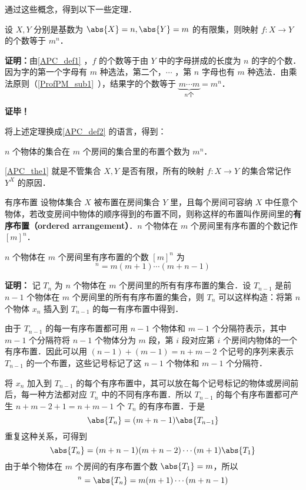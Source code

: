 通过这些概念，得到以下一些定理．

\begin{theorem}{}\label{APC_the1}
设 $X,Y$ 分别是基数为 $\abs{X}=n,\abs{Y}=m$ 的有限集，则映射 $f:X\rightarrow Y$ 的个数等于 $m^n$．
\end{theorem}
\textbf{证明：}由\autoref{APC_def1} ，$f$ 的个数等于由 $Y$ 中的字母拼成的长度为 $n$ 的字的个数．因为字的第一个字母有 $m$ 种选法，第二个，$\cdots$ ，第 $n$ 字母也有 $m$ 种选法．由乘法原则（\autoref{ProfPM_sub1}~），结果字的个数等于 $\underbrace{m\cdots m}_{n\text{个}}=m^n$．

\textbf{证毕！}

将上述定理换成\autoref{APC_def2} 的语言，得到：
\begin{theorem}{}
$n$ 个物体的集合在 $m$ 个房间的集合里的布置个数为 $m^n$．
\end{theorem}

\autoref{APC_the1} 就是不管集合 $X,Y$ 是否有限，所有的映射 $f:X\rightarrow Y$ 的集合常记作 $Y^X$ 的原因．

\begin{definition}{有序布置}
设物体集合 $X$ 被布置在房间集合 $Y$ 里，且每个房间可容纳 $X$ 中任意个物体，若改变房间中物体的顺序得到的布置不同，则称这样的布置叫作房间里的\textbf{有序布置（ordered arrangement）}．$n$ 个物体在 $m$ 个房间里有序布置的个数记作 $[m]^n$．
\end{definition}
\begin{theorem}{}
$n$ 个物体在 $m$ 个房间里有序布置的个数 $[m]^n$ 为
\begin{equation}
[m]^n=m(m+1)\cdots(m+n-1)
\end{equation}
\end{theorem}
\textbf{证明：}
记 $T_n$ 为 $n$ 个物体在 $m$ 个房间里的所有有序布置的集合．设 $T_{n-1}$ 是前 $n-1$ 个物体在 $m$ 个房间里的所有有序布置的集合，则 $T_n$ 可以这样构造：将第 $n$ 个物体 $x_n$ 插入到 $T_{n-1}$ 的每一有序布置中得到．

由于 $T_{n-1}$ 的每一有序布置都可用 $n-1$ 个物体和 $m-1$ 个分隔符表示，其中 $m-1$ 个分隔符将 $n-1$ 个物体分为 $m$ 段，第 $i$ 段对应第 $i$ 个房间内物体的一个有序布置．因此可以用 $(n-1)+(m-1)=n+m-2$ 个记号的序列来表示 $T_{n-1}$ 的一个布置，这些记号标记了这 $n-1$ 个物体和 $m-1$ 个分隔符． 

将 $x_n$ 加入到 $T_{n-1}$ 的每个有序布置中，其可以放在每个记号标记的物体或房间前后，每一种方法都对应 $T_{n}$ 中的不同有序布置．所以 $T_{n-1}$ 的每个有序布置都可产生 $n+m-2+1=n+m-1$ 个 $T_n$ 的有序布置．于是
\begin{equation}
\abs{T_n}=(m+n-1)\abs{T_{n-1}}
\end{equation}
重复这种关系，可得到
\begin{equation}
\abs{T_n}=(m+n-1)(m+n-2)\cdots (m+1)\abs{T_1}
\end{equation}
由于单个物体在 $m$ 个房间的有序布置个数 $\abs{T_1}=m$，所以
\begin{equation}
[m]^n=\abs{T_n}=m(m+1)\cdots(m+n-1)
\end{equation}

